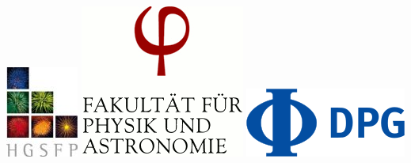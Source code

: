 \vspace{7mm}

\includegraphics[width=.22\textwidth]{media/hgsfp}
\hspace*{2mm}
\includegraphics[width=.35\textwidth]{media/physik}
\hfill
\includegraphics[width=.35\textwidth]{media/dpg}